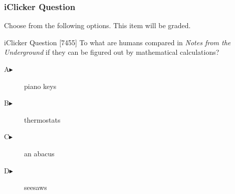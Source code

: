 \begin{frame}
  \frametitle{iClicker Question}
Choose from the following options. This item will be graded.
\begin{block}{iClicker Question}
[7455]   To what are humans compared in \emph{Notes from the Underground} if
  they can be figured out by mathematical calculations?
\end{block}
\begin{description}
\item[A\hspace{.2in}$\blacktriangleright$] piano keys
\item[B\hspace{.2in}$\blacktriangleright$] thermostats
\item[C\hspace{.2in}$\blacktriangleright$] an abacus
\item[D\hspace{.2in}$\blacktriangleright$] seesaws
\end{description}
\end{frame}
